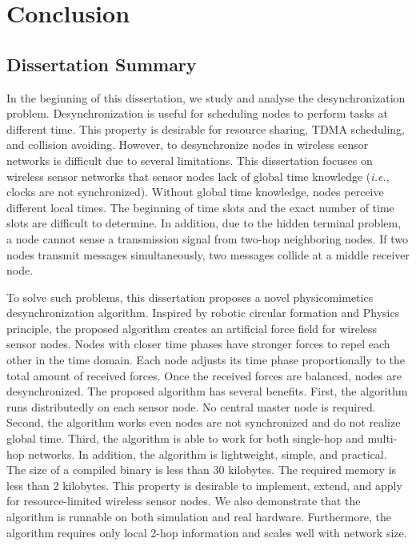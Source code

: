\chapter{Conclusion}
\label{chap:conclusion}
\section{Dissertation Summary}
In the beginning of this dissertation, we study and analyse the desynchronization problem. 
Desynchronization is useful for scheduling nodes to perform tasks at different time.
This property is desirable for resource sharing, TDMA scheduling, and collision avoiding.
However, to desynchronize nodes in wireless sensor networks is difficult due to several limitations.
This dissertation focuses on wireless sensor networks that sensor nodes lack of global time knowledge (\textit{i.e.}, clocks are not synchronized).
Without global time knowledge, nodes perceive different local times. The beginning of time slots and the exact number of time slots are difficult to determine.
In addition, due to the hidden terminal problem, a node cannot sense a transmission signal from two-hop neighboring nodes. If two nodes transmit messages simultaneously, two messages collide at a middle receiver node. 

To solve such problems, this dissertation proposes a novel physicomimetics desynchronization algorithm.
Inspired by robotic circular formation and Physics principle, the proposed algorithm creates an artificial force field for wireless sensor nodes. 
Nodes with closer time phases have stronger forces to repel each other in the time domain. Each node adjusts its time phase proportionally to the total amount of received forces. Once the received forces are balanced, nodes are desynchronized. 
The proposed algorithm has several benefits. First, the algorithm runs distributedly on each sensor node. No central master node is required. Second, the algorithm works even nodes are not synchronized and do not realize global time. Third, the algorithm is able to work for both single-hop and multi-hop networks. In addition, the algorithm is lightweight, simple, and practical. The size of a compiled binary is less than 30 kilobytes. The required memory is less than 2 kilobytes. This property is desirable to implement, extend, and apply for resource-limited wireless sensor nodes. We also demonstrate that the algorithm is runnable on both simulation and real hardware. Furthermore, the algorithm requires only local 2-hop information and scales well with network size. 

